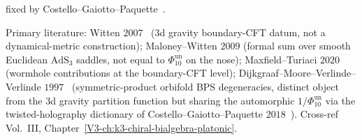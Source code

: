 \begin{remark}
\begin{enumerate}[label=\textup{(\Roman*)}]
 fixed by Costello--Gaiotto--Paquette~\cite{CostelloGaiottoPaquette2018}.
\end{enumerate}
Primary literature: Witten $2007$~\cite{Witten2007}
($3$d gravity boundary-CFT datum, not a dynamical-metric construction);
Maloney--Witten $2009$ (formal sum over smooth Euclidean
$\mathrm{AdS}_3$ saddles, not equal to $\Phi_{10}^{\mathrm{un}}$ on the nose);
Maxfield--Turiaci $2020$ (wormhole contributions at the boundary-CFT
level); Dijkgraaf--Moore--Verlinde--Verlinde
$1997$~\cite{DijkgraafMooreVerlindeVerlinde1997} (symmetric-product
orbifold BPS degeneracies, distinct object from the $3$d gravity
partition function but sharing the automorphic $1/\Phi_{10}^{\mathrm{un}}$ via
the twisted-holography dictionary of
Costello--Gaiotto--Paquette $2018$~\cite{CostelloGaiottoPaquette2018}).
Cross-ref Vol.~III,
Chapter~\ref{V3-ch:k3-chiral-bialgebra-platonic}.
\end{remark}
